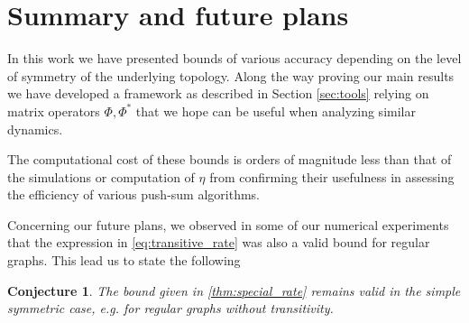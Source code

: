 \documentclass[a4paper,12pt]{article}
\newtheorem{conjecture}{Conjecture}
\begin{document}
\newpage

\section{Summary and future plans}\label{sec:conc}

In this work we have presented bounds of various accuracy depending on the level of symmetry of the underlying topology.
Along the way proving our main results we have developed a framework as described in Section \ref{sec:tools} relying on matrix operators $\Phi, \Phi^*$ that we hope can be useful when analyzing similar dynamics. 

The computational cost of these bounds is orders of magnitude less than that of the simulations or computation of $\eta$ from \cite{gerencser2022computable} confirming their usefulness in assessing the efficiency of various push-sum algorithms.

Concerning our future plans, we observed in some of our numerical experiments that the expression in \eqref{eq:transitive_rate} was also a valid bound for regular graphs. This lead us to state the following
\begin{conjecture}
	The bound given in \ref{thm:special_rate} remains valid in the simple symmetric case, e.g. for regular graphs without transitivity.
\end{conjecture}



\end{document}

